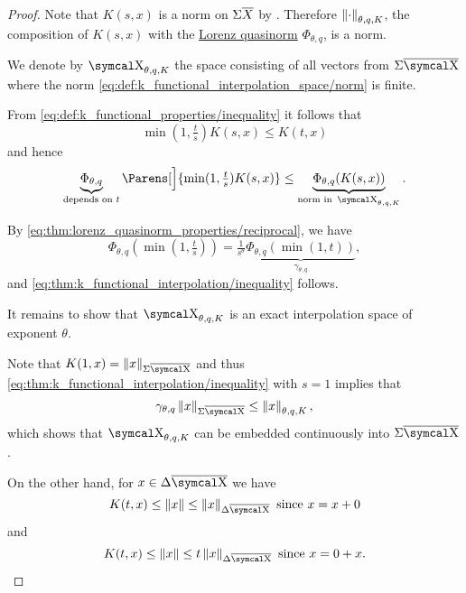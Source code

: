\begin{proof}
  Note that \( K(s, x) \) is a norm on \( \Sigma \overline{X} \) by . Therefore \( \left\Vert \cdot \right\Vert_{\theta,q,K} \), the composition of \( K(s, x) \) with the \hyperref[def:lorenz_quasinorm]{Lorenz quasinorm} \( \Phi_{\theta,q} \), is a norm.

  We denote by \( \CX_{\theta,q,K} \) the space consisting of all vectors from \( \Sigma \Ol{\CX} \) where the norm \eqref{eq:def:k_functional_interpolation_space/norm} is finite.

  From \eqref{eq:def:k_functional_properties/inequality} it follows that
  \begin{equation*}
    \min(1, \tfrac t s) K(s, x) \leq K(t, x)
  \end{equation*}
  and hence
  \begin{equation*}
    \underbrace{\Phi_{\theta,q}}_{\text{depends on } t} \Parens[\Big]{ \min(1, \tfrac t s) K(s, x) } \leq \underbrace{\Phi_{\theta,q}(K(s, x))}_{\text{norm in } \CX_{\theta,q,K}}.
  \end{equation*}

  By \eqref{eq:thm:lorenz_quasinorm_properties/reciprocal}, we have
  \begin{equation*}
    \Phi_{\theta,q}(\min(1, \tfrac t s)) = \tfrac 1 {s^\theta} \underbrace{\Phi_{\theta,q}(\min(1, t))}_{\hyperref[eq:def:lorenz_quasinorm/gamma]{\gamma_{\theta,q}}},
  \end{equation*}
  and \eqref{eq:thm:k_functional_interpolation/inequality} follows.

  It remains to show that \( \CX_{\theta,q,K} \) is an exact interpolation space of exponent \( \theta \).

  Note that \( K(1, x) = \Norm{x}_{\Sigma \Ol{\CX}} \) and thus \eqref{eq:thm:k_functional_interpolation/inequality} with \( s = 1 \) implies that
  \begin{equation*}
    \gamma_{\theta,q} \Norm{x}_{\Sigma \Ol{\CX}} \leq \Norm{x}_{\theta,q,K},
  \end{equation*}
  which shows that \( \CX_{\theta,q,K} \) can be embedded continuously into \( \Sigma \Ol{\CX} \).

  On the other hand, for \( x \in \Delta \Ol{\CX} \) we have
  \begin{equation*}
    K(t, x) \leq \Norm{x} \leq \Norm{x}_{\Delta \Ol{\CX}} \T{since} x = x + 0
  \end{equation*}
  and
  \begin{equation*}
    K(t, x) \leq \Norm{x} \leq t \Norm{x}_{\Delta \Ol{\CX}} \T{since} x = 0 + x.
  \end{equation*}


\end{proof}
